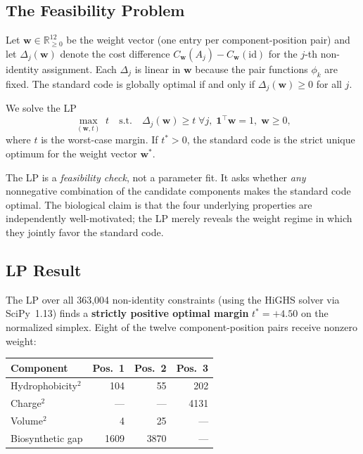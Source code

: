 \documentclass[11pt,twocolumn]{article}
\begin{document}
\subsection{The Feasibility Problem}

Let $\mathbf{w} \in \mathbb{R}_{\geq 0}^{12}$ be the weight vector (one
entry per component-position pair) and let $\Delta_j(\mathbf{w})$ denote
the cost difference $C_{\mathbf{w}}(A_j) - C_{\mathbf{w}}(\text{id})$
for the $j$-th non-identity assignment. Each $\Delta_j$ is linear in
$\mathbf{w}$ because the pair functions $\phi_k$ are fixed. The standard
code is globally optimal if and only if $\Delta_j(\mathbf{w}) \geq 0$ for
all $j$.

We solve the LP
\begin{equation}\label{eq:lp}
  \max_{(\mathbf{w}, t)} \; t
  \quad\text{s.t.}\quad
  \Delta_j(\mathbf{w}) \geq t \;\forall j, \;
  \mathbf{1}^\top \mathbf{w} = 1, \;
  \mathbf{w} \geq 0,
\end{equation}
where $t$ is the worst-case margin. If $t^* > 0$, the standard code is
the strict unique optimum for the weight vector $\mathbf{w}^*$.

The LP is a \emph{feasibility check}, not a parameter fit. It asks whether
\emph{any} nonnegative combination of the candidate components makes the
standard code optimal. The biological claim is that the four underlying
properties are independently well-motivated; the LP merely reveals the
weight regime in which they jointly favor the standard code.

\subsection{LP Result}

The LP over all 363,004 non-identity constraints (using the HiGHS solver
via SciPy~1.13) finds a \textbf{strictly positive optimal margin}
$t^* = +4.50$ on the normalized simplex. Eight of the twelve
component-position pairs receive nonzero weight:

\begin{center}
\small
\begin{tabular}{@{}lrrr@{}}
\toprule
Component & Pos.~1 & Pos.~2 & Pos.~3 \\
\midrule
Hydrophobicity$^2$ & 104 & 55 & 202 \\
Charge$^2$         & --- & --- & 4131 \\
Volume$^2$         & 4 & 25 & --- \\
Biosynthetic gap   & 1609 & 3870 & --- \\
\bottomrule
\end{tabular}
\end{center}
\end{document}
